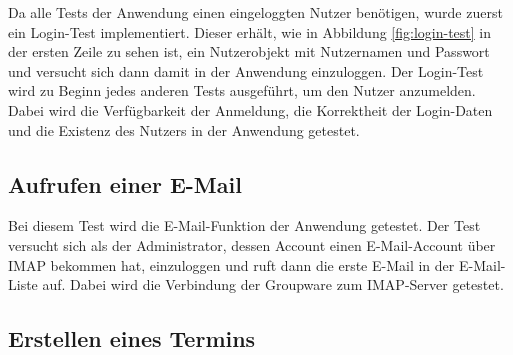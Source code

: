 Da alle Tests der Anwendung einen eingeloggten Nutzer benötigen, wurde zuerst ein Login-Test implementiert. Dieser erhält, wie in Abbildung \ref{fig:login-test} in der ersten Zeile zu sehen ist, ein Nutzerobjekt mit Nutzernamen und Passwort und versucht sich dann damit in der Anwendung einzuloggen.
Der Login-Test wird zu Beginn jedes anderen Tests ausgeführt, um den Nutzer anzumelden.
Dabei wird die Verfügbarkeit der Anmeldung, die Korrektheit der Login-Daten und die Existenz des Nutzers in der Anwendung getestet.

\subsection*{Aufrufen einer E-Mail}

Bei diesem Test wird die E-Mail-Funktion der Anwendung getestet.
Der Test versucht sich als der Administrator, dessen Account einen E-Mail-Account über IMAP bekommen hat, einzuloggen und ruft dann die erste E-Mail in der E-Mail-Liste auf.
Dabei wird die Verbindung der Groupware zum IMAP-Server getestet.

\subsection*{Erstellen eines Termins}

